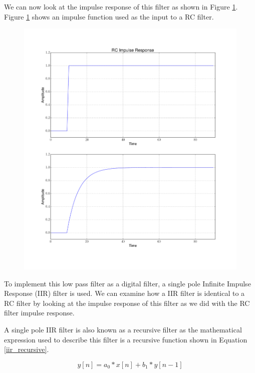 We can now look at the impulse response of this filter as shown in Figure \ref{rc_response}.  Figure \ref{rc_response} shows an impulse function used as the input to a RC filter.

{\begin{figure}[h!tb] 
\centering
\includegraphics[width=17cm]{Experiments/Exp6/rc_response.pdf}
\label{rc_response}
\end{figure}
}

To implement this low pass filter as a digital filter, a single pole Infinite Impulse Response (IIR) filter is used.  We can examine how a IIR filter is identical to a RC filter by looking at the impulse response of this filter as we did with the RC filter impulse response.

A single pole IIR filter is also known as a recursive filter as the mathematical expression used to describe this filter is a recursive function shown in Equation \ref{iir_recursive}.  

\begin{equation}\label{iir_recursive}
y[n] = a_0 * x[n] + b_1 * y[n-1]
\end{equation}

